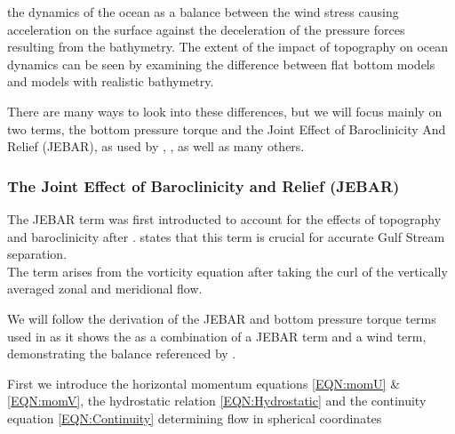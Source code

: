 \documentclass[..\EOYR.tex]{subfiles}
\begin{document}
\citep{NaveiraGarabato2013}  the dynamics of the ocean as a balance between the wind stress causing acceleration on the surface against the deceleration of the pressure forces resulting from the bathymetry.
The extent of the impact of topography on ocean dynamics can be seen by examining the difference between flat bottom models and models with realistic bathymetry. 

There are many ways to look into these differences, but we will focus mainly on two terms, the bottom pressure torque and the Joint Effect of Baroclinicity And Relief (JEBAR), as used by \citep{Greatbatch1991}, \citep{Bell1999}, \citep{Gula2014} as well as many others. 


\subsubsection*{The Joint Effect of Baroclinicity and Relief (JEBAR)}

The JEBAR term was first introducted to account for the effects of topography and baroclinicity after . \citep{Ezer2016b} states that this term is crucial for accurate Gulf Stream separation. \\
The term arises from the  vorticity equation after taking the curl of the vertically averaged zonal and meridional flow.
\par
We will follow the derivation of the JEBAR and bottom pressure torque terms used in \citep{Greatbatch1991} as it shows the  as a combination of a JEBAR term and a wind term, demonstrating the balance referenced by \citep{NaveiraGarabato2013}.

First we introduce the horizontal momentum equations \ref{EQN:momU} \& \ref{EQN:momV}, the hydrostatic relation \ref{EQN:Hydrostatic} and the continuity equation \ref{EQN:Continuity} determining flow in spherical coordinates





\end{document}
